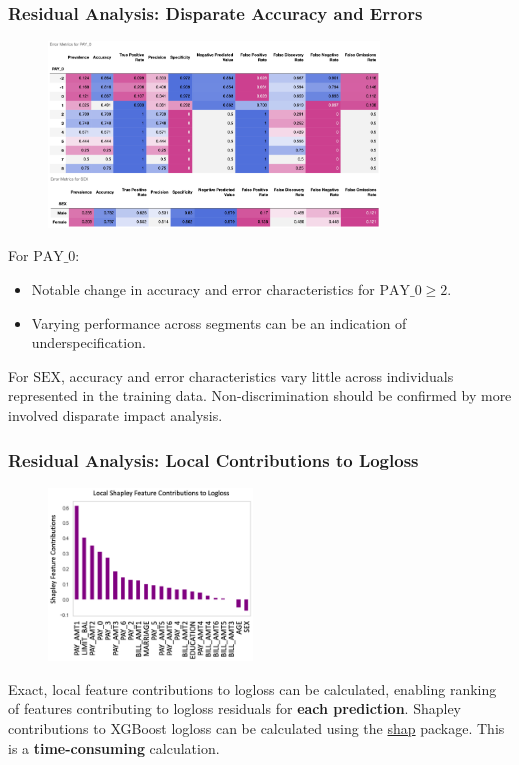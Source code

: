 \documentclass[11pt,
               aspectratio=169,
               hyperref={colorlinks}
               ]{beamer}
\begin{document}
			\begin{frame}[t]
		
				\frametitle{\textbf{Residual Analysis}: Disparate Accuracy and Errors}
		
		                 \vspace{-10pt}
				\begin{figure}
					\begin{center}
						\includegraphics[height=140pt]{img/de.png}
					\end{center}
				\end{figure}
				\vspace{-15pt}
				\tiny For $\text{PAY\_0}$:
				\begin{itemize}
					\item Notable change in accuracy and error characteristics for $\text{PAY\_0} \geq 2$. 
					\item Varying performance across segments can be an indication of underspecification. 
				\end{itemize}
				For $\text{SEX}$, accuracy and error characteristics vary little across individuals represented in the training data. Non-discrimination should be confirmed by more involved disparate impact analysis.
		
			\end{frame}

			\begin{frame}
	
				\frametitle{\textbf{Residual Analysis}: Local Contributions to Logloss}
	
				\begin{figure}
					\begin{center}
						\includegraphics[height=130pt]{img/local.png}
					\end{center}
				\end{figure}	
				\scriptsize{Exact, local feature contributions to logloss can be calculated, enabling ranking of features contributing to logloss residuals for \textbf{each prediction}. Shapley contributions to XGBoost logloss can be calculated using the \href{https://github.com/slundberg/shap}{shap} package. This is a \textbf{time-consuming} calculation.}
				
			\end{frame}
\end{document}
